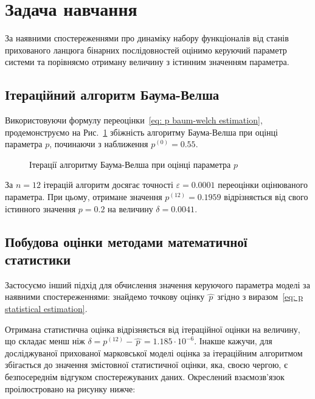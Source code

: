 \section{Задача навчання}
\label{chap: learning}

За наявними спостереженнями про динаміку набору функціоналів від станів прихованого ланцюга бінарних послідовностей оцінимо керуючий параметр системи та порівняємо отриману величину з істинним значенням параметра.

\subsection{Ітераційний алгоритм Баума-Велша}

Використовуючи формулу переоцінки~\eqref{eq: p baum-welch estimation}, продемонструємо на Рис.~\ref{pic: p baum-welch estimation} збіжність алгоритму Баума-Велша при оцінці параметра $p$, починаючи з наближення $p^{(0)}=0.55$.

\begin{figure}[H]\centering
    \setfontsize{14pt}
    
    \caption{Ітерації алгоритму Баума-Велша при оцінці параметра $p$}
    \label{pic: p baum-welch estimation}
\end{figure}

За $n=12$ ітерацій алгоритм досягає точності $\varepsilon=0.0001$ переоцінки оцінюваного параметра. При цьому, отримане значення $p^{(12)}=0.1959$ відрізняється від свого істинного значення $p=0.2$ на величину $\delta=0.0041$.

\subsection{Побудова оцінки методами математичної статистики}

Застосуємо інший підхід для обчислення значення керуючого параметра моделі за наявними спостереженнями: знайдемо точкову оцінку $\widehat{\,p\,}$ згідно з виразом~\eqref{eq: p statistical estimation}.

Отримана статистична оцінка відрізняється від ітераційної оцінки на величину, що складає менш ніж $\delta=p^{(12)}-\widehat{\,p\,}=1.185 \cdot 10^{-6}$. Інакше кажучи, для досліджуваної прихованої марковської моделі оцінка за ітераційним алгоритмом збігається до значення змістовної статистичної оцінки, яка, своєю чергою, є безпосереднім відгуком спостережуваних даних. Окреслений взаємозв'язок проілюстровано на рисунку нижче:

